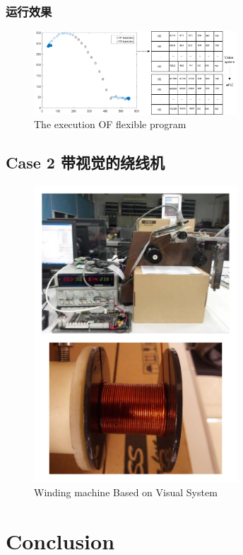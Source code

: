 \documentclass[journal,UTF8]{IEEEtran}
\begin{document}
\subsubsection{运行效果}



\begin{figure}
	\centering
	\includegraphics[width=3in]{fig/trajectory.png}
	\caption{ The execution OF flexible program}
	\label{fig:settingexecutionbitinACPTD}
\end{figure}

\subsection{Case 2 带视觉的绕线机}

\begin{figure}
	\centering
	\includegraphics[width=3in]{fig/Winding.pdf}
	\caption{ Winding machine Based on Visual System}
	\label{fig:Winding}
\end{figure}
\section{Conclusion}
\label{conclusion}
\end{document}
